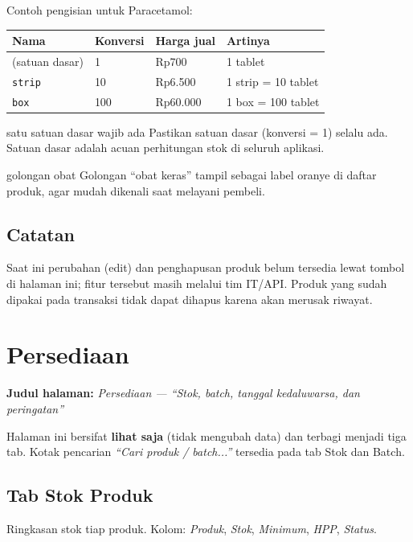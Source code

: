 \documentclass[11pt,a4paper]{article}
\newcommand{\btn}[1]{\textcolor{primary}{\textbf{#1}}}
\newcommand{\field}[1]{\textit{#1}}
\newcommand{\code}[1]{\texttt{\small #1}}
\begin{document}
Contoh pengisian untuk Paracetamol:

\begin{tabularx}{\textwidth}{@{}L{3cm}L{2.4cm}L{3.6cm}Y@{}}
  \toprule
  \textbf{Nama} & \textbf{Konversi} & \textbf{Harga jual} & \textbf{Artinya} \\
  \midrule
  (satuan dasar) & 1   & Rp700     & 1 tablet \\
  \code{strip}   & 10  & Rp6.500   & 1 strip = 10 tablet \\
  \code{box}     & 100 & Rp60.000  & 1 box = 100 tablet \\
  \bottomrule
\end{tabularx}

\begin{warnbox}{satu satuan dasar wajib ada}
Pastikan satuan dasar (konversi = 1) selalu ada. Satuan dasar adalah acuan
perhitungan stok di seluruh aplikasi.
\end{warnbox}

\begin{tipbox}{golongan obat}
Golongan ``obat keras'' tampil sebagai label oranye di daftar produk, agar mudah
dikenali saat melayani pembeli.
\end{tipbox}

\subsection{Catatan}
Saat ini perubahan (edit) dan penghapusan produk belum tersedia lewat tombol di
halaman ini; fitur tersebut masih melalui tim IT/API. Produk yang sudah dipakai
pada transaksi tidak dapat dihapus karena akan merusak riwayat.

\section{Persediaan}
\textbf{Judul halaman:} \emph{Persediaan --- ``Stok, batch, tanggal kedaluwarsa, dan peringatan''}

Halaman ini bersifat \textbf{lihat saja} (tidak mengubah data) dan terbagi
menjadi tiga tab. Kotak pencarian \field{``Cari produk / batch...''} tersedia
pada tab Stok dan Batch.

\subsection{Tab \btn{Stok Produk}}
Ringkasan stok tiap produk. Kolom: \field{Produk}, \field{Stok},
\field{Minimum}, \field{HPP}, \field{Status}.
\end{document}
